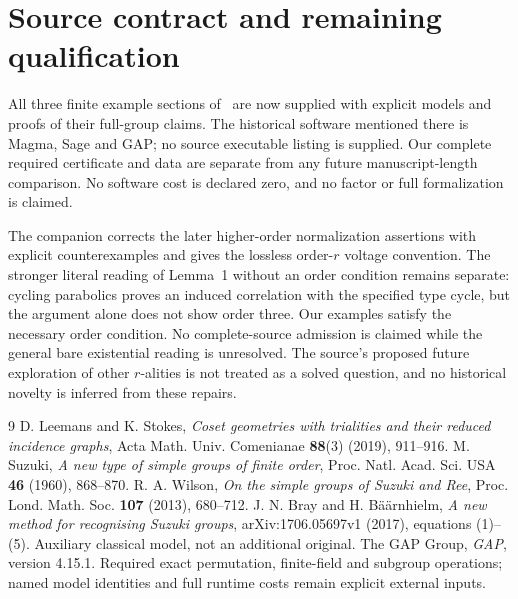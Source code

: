 \documentclass[11pt,a4paper]{article}
\begin{document}
\section{Source contract and remaining qualification}
All three finite example sections of~\cite{LS} are now supplied with
explicit models and proofs of their full-group claims. The historical
software mentioned there is Magma, Sage and GAP; no source executable
listing is supplied. Our complete required certificate and data are
separate from any future manuscript-length comparison. No software cost
is declared zero, and no factor or full formalization is claimed.

The companion corrects the later higher-order normalization assertions with
explicit counterexamples and gives the lossless order-$r$ voltage convention.
The stronger literal reading of Lemma~1 without an order condition remains
separate: cycling parabolics proves an induced correlation with the specified
type cycle, but the argument alone does not show order three. Our examples
satisfy the necessary order condition. No complete-source admission is
claimed while the general bare existential reading is unresolved. The source's
proposed future exploration of other $r$-alities is not treated as a solved
question, and no historical novelty is inferred from these repairs.

\begin{thebibliography}{9}
 D. Leemans and K. Stokes, \emph{Coset geometries with trialities
and their reduced incidence graphs}, Acta Math. Univ. Comenianae
\textbf{88}(3) (2019), 911--916.
 M. Suzuki, \emph{A new type of simple groups of finite order},
Proc. Natl. Acad. Sci. USA \textbf{46} (1960), 868--870.
 R. A. Wilson, \emph{On the simple groups of Suzuki and Ree},
Proc. Lond. Math. Soc. \textbf{107} (2013), 680--712.
 J. N. Bray and H. B\"a\"arnhielm, \emph{A new method for recognising Suzuki groups}, arXiv:1706.05697v1 (2017), equations (1)--(5). Auxiliary classical model, not an additional original.
 The GAP Group, \emph{GAP}, version 4.15.1. Required exact
permutation, finite-field and subgroup operations; named model identities
and full runtime costs remain explicit external inputs.
\end{thebibliography}
\end{document}
